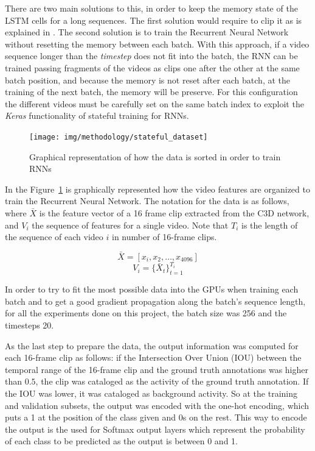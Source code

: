 There are two main solutions to this, in order to keep the memory state of the LSTM cells for a long sequences. The first solution would require to clip it as is explained in \cite{pascanu2012difficulty}. The second solution is to train the Recurrent Neural Network without resetting the memory between each batch. With this approach, if a video sequence longer than the \textit{timestep} does not fit into the batch, the RNN can be trained passing fragments of the videos as clips one after the other at the same batch position, and because the memory is not reset after each batch, at the training of the next batch, the memory will be preserve. For this configuration the different videos must be carefully set on the same batch index to exploit the \textit{Keras} functionality of stateful training for RNNs.

\begin{figure}[H]
\begin{center}
\texttt{[image: img/methodology/stateful\_dataset]}
\end{center}
\caption{Graphical representation of how the data is sorted in order to train RNNs}
\label{fig:stateful_dataset}
\end{figure}

In the Figure~\ref{fig:stateful_dataset} is graphically represented how the video features are organized to train the Recurrent Neural Network. The notation for the data is as follows, where $\bar{X}$ is the feature vector of a 16 frame clip extracted from the C3D network, and $V_i$ the sequence of features for a single video. Note that $T_i$ is the length of the sequence of each video $i$ in number of 16-frame clips.

\begin{equation}
	\bar{X} = [x_i, x_2, \ldots, x_{4096}]
\end{equation}
\begin{equation}
	V_i = \{ \bar{X}_t \}_{t=1}^{T_i}
\end{equation}

In order to try to fit the most possible data into the GPUs when training each batch and to get a good gradient propagation along the batch's sequence length, for all the experiments done on this project, the batch size was 256 and the timesteps 20.

As the last step to prepare the data, the output information was computed for each 16-frame clip as follows: if the Intersection Over Union (IOU) between the temporal range of the 16-frame clip and the ground truth annotations was higher than $0.5$, the clip was cataloged as the activity of the ground truth annotation. If the IOU was lower, it was cataloged as background activity. So at the training and validation subsets, the output was encoded with the one-hot encoding, which puts a 1 at the position of the class given and 0s on the rest. This way to encode the output is the used for Softmax output layers which represent the probability of each class to be predicted as the output is between 0 and 1.

